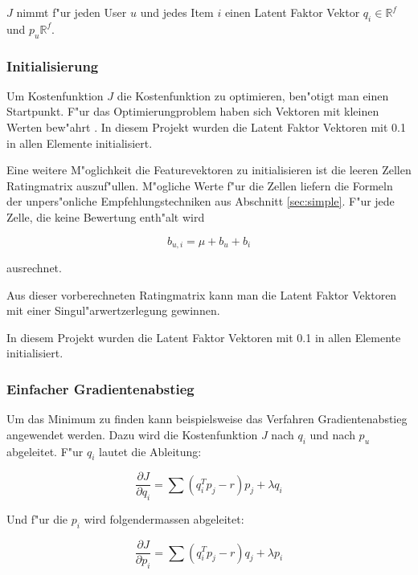 \documentclass[a4paper, 12pt]{article}
\begin{document}
$J$ nimmt f"ur jeden User $u$ und jedes Item $i$ einen Latent Faktor Vektor $q_i \in \mathbb{R}^f$ und $p_u \mathbb{R}^f$.

\subsubsection{Initialisierung}
\label{sec:init}

Um Kostenfunktion $J$ die Kostenfunktion zu optimieren, ben"otigt man einen Startpunkt. F"ur das Optimierungproblem \label{eq:objective} haben sich Vektoren mit kleinen Werten bew"ahrt \cite{Takacs08}. In diesem Projekt wurden die Latent Faktor Vektoren mit 0.1 in allen Elemente initialisiert.

Eine weitere M"oglichkeit die Featurevektoren zu initialisieren ist die leeren Zellen Ratingmatrix auszuf"ullen. M"ogliche Werte f"ur die Zellen liefern die Formeln der unpers"onliche Empfehlungstechniken aus Abschnitt \ref{sec:simple}. F"ur jede Zelle, die keine Bewertung enth"alt wird

\begin{equation}
  \label{eq:mu2}
    b_{u,i} = \mu + b_u + b_i
\end{equation}

ausrechnet.

Aus dieser vorberechneten Ratingmatrix kann man die Latent Faktor Vektoren mit einer Singul"arwertzerlegung gewinnen.

In diesem Projekt wurden die Latent Faktor Vektoren mit 0.1 in allen Elemente initialisiert.

\subsubsection{Einfacher Gradientenabstieg}
\label{sec:gradientdescent}
 
Um das Minimum zu finden kann beispielsweise das Verfahren Gradientenabstieg angewendet werden. Dazu wird die Kostenfunktion $J$ nach $q_i$ und nach $p_u$ abgeleitet. F"ur $q_i$ lautet die Ableitung:

\begin{equation}
  \label{eq:decx}
  \frac{ \partial J }{ \partial q_i } = \sum (q_i^T p_j - r) p_j + \lambda q_i
\end{equation}

Und f"ur die $p_i$ wird folgendermassen abgeleitet:

\begin{equation}
  \label{eq:dectheta}
  \frac{ \partial J }{ \partial p_i } = \sum (q_i^T p_j - r) q_j + \lambda p_i
\end{equation}
\end{document}
